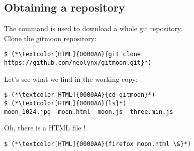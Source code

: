 

\subsection{Obtaining a repository}
\begin{frame}[fragile]
  \subslidetitle
  The command  is used to download a whole git repository.
  \\
  \vspace{1em}
  Clone the gitmoon repository:
  \begin{lstlisting}
$ (*\textcolor[HTML]{0000AA}{git clone https://github.com/neolynx/gitmoon.git}*)
\end{lstlisting}


  Let's see what we find in the working copy:
  \begin{lstlisting}
$ (*\textcolor[HTML]{0000AA}{cd gitmoon}*)
$ (*\textcolor[HTML]{0000AA}{ls}*)
moon_1024.jpg  moon.html  moon.js  three.min.js
\end{lstlisting}

  Oh, there is a HTML file !
  \begin{lstlisting}
$ (*\textcolor[HTML]{0000AA}{firefox moon.html \&}*)
\end{lstlisting}
\end{frame}

